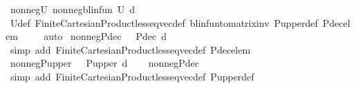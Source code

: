 \begin{isabellebody}
\isanewline
{}\isamarkupfalse%
\ nonneg{\isacharunderscore}{\kern0pt}{\isasymP}\isactrlsub U{\isacharcolon}{\kern0pt}\ {\isachardoublequoteopen}nonneg{\isacharunderscore}{\kern0pt}blinfun\ {\isacharparenleft}{\kern0pt}{\isasymP}\isactrlsub U\ d{\isacharparenright}{\kern0pt}{\isachardoublequoteclose}\isanewline
%
\isadelimproof
\ \ %
\endisadelimproof
%
\isatagproof
{}\isamarkupfalse%
\ {\isasymP}\isactrlsub U{\isacharunderscore}{\kern0pt}def\ Finite{\isacharunderscore}{\kern0pt}Cartesian{\isacharunderscore}{\kern0pt}Product{\isachardot}{\kern0pt}less{\isacharunderscore}{\kern0pt}eq{\isacharunderscore}{\kern0pt}vec{\isacharunderscore}{\kern0pt}def\ blinfun{\isacharunderscore}{\kern0pt}to{\isacharunderscore}{\kern0pt}matrix{\isacharunderscore}{\kern0pt}inv\ P{\isacharunderscore}{\kern0pt}upper{\isacharunderscore}{\kern0pt}def\ P{\isacharunderscore}{\kern0pt}dec{\isacharunderscore}{\kern0pt}elem\ \isanewline
\ \ \isamarkupfalse%
\ auto%
\endisatagproof
{\isafoldproof}%
%
\isadelimproof
\isanewline
%
\endisadelimproof
\isanewline
{}\isamarkupfalse%
\ nonneg{\isacharunderscore}{\kern0pt}P{\isacharunderscore}{\kern0pt}dec{\isacharcolon}{\kern0pt}\ {\isachardoublequoteopen}{}\ {\isasymle}\ P{\isacharunderscore}{\kern0pt}dec\ d{\isachardoublequoteclose}\isanewline
%
\isadelimproof
\ \ %
\endisadelimproof
%
\isatagproof
{}\isamarkupfalse%
\ {\isacharparenleft}{\kern0pt}simp\ add{\isacharcolon}{\kern0pt}\ Finite{\isacharunderscore}{\kern0pt}Cartesian{\isacharunderscore}{\kern0pt}Product{\isachardot}{\kern0pt}less{\isacharunderscore}{\kern0pt}eq{\isacharunderscore}{\kern0pt}vec{\isacharunderscore}{\kern0pt}def\ P{\isacharunderscore}{\kern0pt}dec{\isacharunderscore}{\kern0pt}elem{\isacharparenright}{\kern0pt}%
\endisatagproof
{\isafoldproof}%
%
\isadelimproof
\isanewline
%
\endisadelimproof
\isanewline
{}\isamarkupfalse%
\ nonneg{\isacharunderscore}{\kern0pt}P{\isacharunderscore}{\kern0pt}upper{\isacharcolon}{\kern0pt}\ {\isachardoublequoteopen}{}\ {\isasymle}\ P{\isacharunderscore}{\kern0pt}upper\ d{\isachardoublequoteclose}\isanewline
%
\isadelimproof
\ \ %
\endisadelimproof
%
\isatagproof
{}\isamarkupfalse%
\ nonneg{\isacharunderscore}{\kern0pt}P{\isacharunderscore}{\kern0pt}dec\ \isanewline
\ \ \isamarkupfalse%
\ {\isacharparenleft}{\kern0pt}simp\ add{\isacharcolon}{\kern0pt}\ Finite{\isacharunderscore}{\kern0pt}Cartesian{\isacharunderscore}{\kern0pt}Product{\isachardot}{\kern0pt}less{\isacharunderscore}{\kern0pt}eq{\isacharunderscore}{\kern0pt}vec{\isacharunderscore}{\kern0pt}def\ P{\isacharunderscore}{\kern0pt}upper{\isacharunderscore}{\kern0pt}def{\isacharparenright}{\kern0pt}%

\end{isabellebody}

